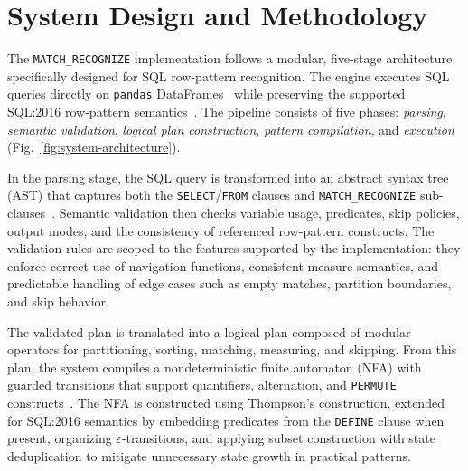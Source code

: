 \providecommand{\mr}{\texttt{MATCH\_RECOGNIZE}}
\chapter{System Design and Methodology}
\label{chap:methodology}

The \texttt{MATCH\_RECOGNIZE} implementation follows a modular,
five-stage architecture specifically designed for SQL row-pattern
recognition.  The engine executes SQL queries directly on
\texttt{pandas} DataFrames~\cite{monierashraf2025rowmatch} while
preserving the supported SQL:2016 row-pattern semantics~\cite{iso2016,ISO2021,melton2017sqlrpr}.
The pipeline consists of five phases: \emph{parsing},
\emph{semantic validation}, \emph{logical plan construction},
\emph{pattern compilation}, and \emph{execution}
(Fig.~\ref{fig:system-architecture}).

In the parsing stage, the SQL query is transformed into an abstract
syntax tree (AST) that captures both the \texttt{SELECT}/\texttt{FROM}
clauses and \texttt{MATCH\_RECOGNIZE} sub-clauses~\cite{tarazona2021antlr,parr2013definitive}.
Semantic validation then checks variable usage, predicates, skip
policies, output modes, and the consistency of referenced
row-pattern constructs.  The validation rules are scoped to the
features supported by the implementation: they enforce correct use of
navigation functions, consistent measure semantics, and predictable
handling of edge cases such as empty matches, partition boundaries,
and skip behavior.

The validated plan is translated into a logical plan composed of
modular operators for partitioning, sorting, matching, measuring,
and skipping.  From this plan, the system compiles a
nondeterministic finite automaton (NFA) with guarded transitions
that support quantifiers, alternation, and \texttt{PERMUTE}
constructs~\cite{salomaa1996nfa}.  The NFA is constructed using
Thompson's construction, extended for SQL:2016 semantics by
embedding predicates from the \texttt{DEFINE} clause when present,
organizing $\varepsilon$-transitions, and applying subset
construction with state deduplication to mitigate unnecessary state
growth in practical patterns.

